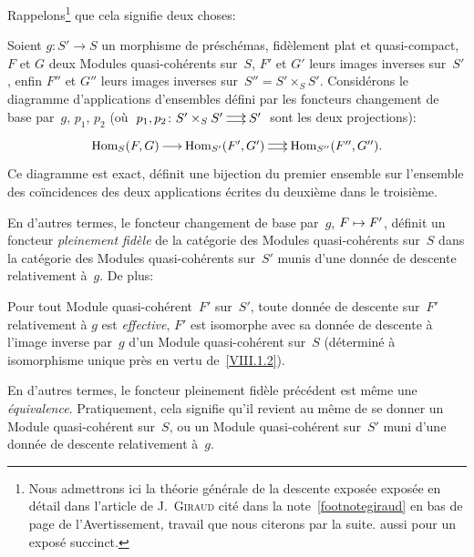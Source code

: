 Rappelons\footnote{Nous admettrons ici la th\'eorie
g\'en\'erale de la descente expos\'ee expos\'ee en d\'etail
dans l'article de J.\, \textsc{Giraud} cit\'e dans la
note~\eqref{footnotegiraud} en bas de page de l'Avertissement, travail
que nous citerons \cite{VIII.D} par la suite. \Cf aussi \cite{VIII.2} pour un expos\'e
succinct.} que cela signifie deux choses:

\begin{corollaire}
\label{VIII.1.2}
Soient $g\colon S'\to S$ un morphisme de pr\'esch\'emas,
fid\`element plat et quasi-compact, $F$ et $G$ deux Modules
quasi-coh\'erents sur~$S$, $F'$ et $G'$ leurs images inverses
sur~$S'$, enfin $F''$ et $G''$ leurs images inverses
sur~$S''=S'\times_{S}S'$. Consid\'erons le diagramme d'applications
d'ensembles d\'efini par les foncteurs changement de base par~$g$,
$p_{1}$, $p_{2}$ (o\`u $\xymatrix@C=.5cm{{p_{1},p_{2}\colon
S'\times_{S}S'}\ar@<2pt>[r]\ar@<-2pt>[r]&{S'}}$ sont les deux
projections):
$$
\xymatrix@C=.5cm{{\mathrm{Hom}_{S}(F,G)}\ar[r]&{\mathrm{Hom}_{S'}(F',G')}\ar@<2pt>[r]\ar@<-2pt>[r]&{\mathrm{Hom}_{S''}(F'',G'').}}
$$
Ce diagramme est exact, \ie d\'efinit une bijection du premier
ensemble sur l'ensemble des co\"incidences des deux applications
\'ecrites du deuxi\`eme dans le troisi\`eme.
\end{corollaire}

En d'autres termes, le foncteur changement de base
par~$g$,
$F\mto F'$, d\'efinit un foncteur \emph{pleinement
fidèle} de la cat\'egorie des Modules quasi-coh\'erents sur~$S$ dans la cat\'egorie des Modules quasi-coh\'erents sur~$S'$
munis d'une donn\'ee de descente relativement
\`a~$g$.
De plus:

\begin{corollaire}
\label{VIII.1.3}
Pour tout Module quasi-coh\'erent~$F'$ sur~$S'$, toute donn\'ee de
descente sur~$F'$ relativement \`a $g$ est \emph{effective},
\ie $F'$ est isomorphe avec sa donn\'ee de descente \`a l'image
inverse par~$g$ d'un Module quasi-coh\'erent sur~$S$
(d\'etermin\'e \`a isomorphisme unique pr\`es en vertu
de~\ref{VIII.1.2}).
\end{corollaire}

En d'autres termes, le foncteur pleinement fid\`ele
pr\'ec\'edent est m\^eme une
\emph{équivalence}. Pratiquement, cela signifie qu'il revient au
m\^eme de se donner un Module quasi-coh\'erent sur~$S$, ou un
Module quasi-coh\'erent sur~$S'$ muni d'une donn\'ee de descente
relativement \`a~$g$.

